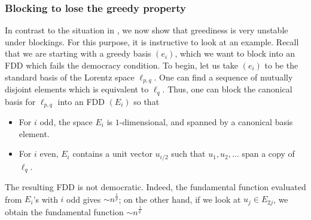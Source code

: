 \documentclass[12pt,leqno]{amsart}
\numberwithin{equation}{section}
\theoremstyle{definition}
\begin{document}
\subsubsection{Blocking to lose the greedy property}\label{lose}
In contrast to the situation in , we now show that greediness is very unstable under blockings. %
For this purpose, it is instructive to look at an example. Recall that we are starting with a greedy basis $(e_i)$, which we want to block into an FDD which fails the democracy condition. To begin, let us take $(e_i)$ to be the standard basis of the Lorentz space $\ell_{p,q}$. One can find a sequence of mutually disjoint elements which is equivalent to $\ell_q$. Thus, one can block the canonical basis for $\ell_{p,q}$ into an FDD $(E_i)$ so that 
\begin{itemize}
    \item For $i$ odd, the space $E_i$ is $1$-dimensional, and spanned by a canonical basis element.
    \item For $i$ even, $E_i$ contains a unit vector $u_{i/2}$ such that $u_1,u_2,\dots$ span a copy of $\ell_q$.
\end{itemize}
The resulting FDD is not democratic. Indeed, the fundamental function evaluated from $E_i$'s with $i$ odd gives $\sim n^\frac{1}{p}$; on the other hand, if we look at $u_j\in E_{2j}$, we obtain the fundamental function $\sim n^\frac{1}{q.}$
\medskip
\end{document}
